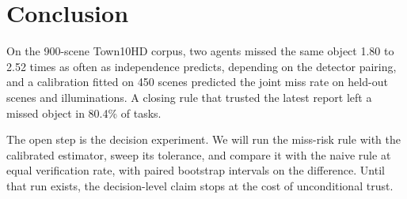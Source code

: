 \section{Conclusion}

On the 900-scene Town10HD corpus, two agents missed the same object 1.80 to
2.52 times as often as independence predicts, depending on the detector
pairing, and a calibration fitted on 450 scenes predicted the joint miss rate
on held-out scenes and illuminations. A closing rule that trusted the latest
report left a missed object in 80.4\% of tasks.

The open step is the decision experiment. We will run the miss-risk rule with
the calibrated estimator, sweep its tolerance, and compare it with the naive
rule at equal verification rate, with paired bootstrap intervals on the
difference. Until that run exists, the decision-level claim stops at the cost
of unconditional trust.
